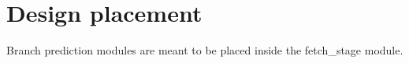 \section{Design placement}
\label{chapter2}

Branch prediction modules are meant to be placed inside the fetch\_stage module.